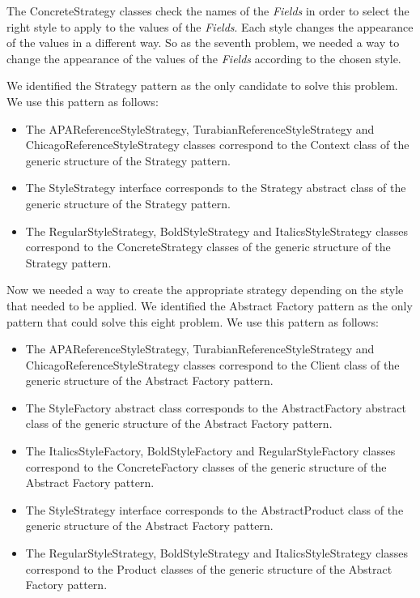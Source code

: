 \documentclass[a4paper]{article}
\begin{document}
The ConcreteStrategy classes check the names of the \textit{Fields} in order to select the right style to apply to the values of the \textit{Fields}. Each style changes the appearance of the values in a different way. So as the seventh problem, we needed a way to change the appearance of the values of the \textit{Fields} according to the chosen style.

We identified the Strategy pattern as the only candidate to solve this problem. We use this pattern as follows:

\begin{itemize}
	\item The APAReferenceStyleStrategy, TurabianReferenceStyleStrategy and ChicagoReferenceStyleStrategy classes correspond to the Context class of the generic structure of the Strategy pattern.
	\item The StyleStrategy interface corresponds to the Strategy abstract class of the generic structure of the Strategy pattern.
	\item The RegularStyleStrategy, BoldStyleStrategy and ItalicsStyleStrategy classes correspond to the ConcreteStrategy classes of the generic structure of the Strategy pattern.
\end{itemize}

Now we needed a way to create the appropriate strategy depending on the style that needed to be applied. We identified the Abstract Factory pattern as the only pattern that could solve this eight problem. We use this pattern as follows:

\begin{itemize}
	\item The APAReferenceStyleStrategy, TurabianReferenceStyleStrategy and ChicagoReferenceStyleStrategy classes correspond to the Client class of the generic structure of the Abstract Factory pattern.
	\item The StyleFactory abstract class corresponds to the AbstractFactory abstract class of the generic structure of the Abstract Factory pattern.
	\item The ItalicsStyleFactory, BoldStyleFactory and RegularStyleFactory classes correspond to the ConcreteFactory classes of the generic structure of the Abstract Factory pattern.
	\item The StyleStrategy interface corresponds to the AbstractProduct class of the generic structure of the Abstract Factory pattern.
	\item The RegularStyleStrategy, BoldStyleStrategy and ItalicsStyleStrategy classes correspond to the Product classes of the generic structure of the Abstract Factory pattern.
\end{itemize}
\end{document}
